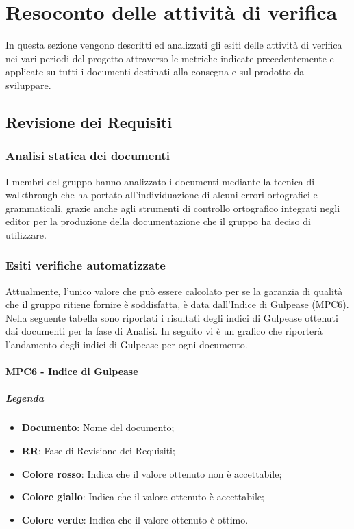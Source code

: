 \section{Resoconto delle attività di verifica}
In questa sezione vengono descritti ed analizzati gli esiti delle attività di verifica nei vari periodi del progetto attraverso le metriche indicate precedentemente e applicate su tutti i documenti destinati alla consegna e sul prodotto da sviluppare.

\subsection{Revisione dei Requisiti}

\subsubsection{Analisi statica dei documenti}
I membri del gruppo \Gruppo{} hanno analizzato i documenti mediante la tecnica di walkthrough che ha portato all'individuazione di 
alcuni errori ortografici e grammaticali, grazie anche agli strumenti di controllo ortografico integrati negli editor per la produzione
della documentazione che il gruppo ha deciso di utilizzare.

\subsubsection{Esiti verifiche automatizzate}
Attualmente, l'unico valore che può essere calcolato per  se la garanzia di qualità che il gruppo ritiene fornire è
soddisfatta, è data dall'Indice di Gulpease (MPC6).
Nella seguente tabella sono riportati i risultati degli indici di Gulpease ottenuti dai documenti per la fase di Analisi.
In seguito vi è un grafico che riporterà l'andamento degli indici di Gulpease per ogni documento.

\paragraph{MPC6 - Indice di Gulpease}
\subparagraph*{Legenda}
\begin{itemize}
	\item \textbf{Documento}: Nome del documento;
	\item \textbf{RR}: Fase di Revisione dei Requisiti;
	\item \textbf{Colore rosso}: Indica che il valore ottenuto non è accettabile;
	\item \textbf{Colore giallo}: Indica che il valore ottenuto è accettabile;
	\item \textbf{Colore verde}: Indica che il valore ottenuto è ottimo. 
\end{itemize}

